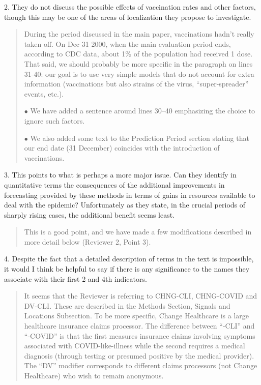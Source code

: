 \documentclass[11pt]{article}
\newenvironment{resp}{\begin{quote}\color{cobalt}}{\end{quote}}
\begin{document}
  2. They do not discuss the possible effects of vaccination rates and other
  factors, though this may be one of the areas of localization they propose to
  investigate.



\begin{resp}
  During the period discussed in the main paper, vaccinations hadn’t really
  taken off. On Dec 31 2000, when the main evaluation period ends,  according to
  CDC data, about 1\% of the population 
  had received 1 dose. That said, we should probably be more specific in the
  paragraph on lines 31-40: our goal is to use very simple models that do not
  account for extra information (vaccinations but also strains of the virus,
  ``super-spreader'' events, etc.).

  $\bullet$ We have added a sentence around lines 30--40 emphasizing the choice
  to ignore such factors.

  $\bullet$ We also added some text to the Prediction Period section stating
  that our end 
  date (31 December) coincides with the introduction of vaccinations.
\end{resp}


  3. This points to what is perhaps a more major issue. Can they identify in
  quantitative terms the consequences of the additional improvements in
  forecasting provided by these methods in terms of gains in resources available
  to deal with the epidemic? Unfortunately as they state, in the crucial periods
  of sharply rising cases, the additional benefit seems least.


\begin{resp}
  This is a good point, and we have made a few modifications described in more
  detail below (Reviewer 2, Point 3).
\end{resp}



  4. Despite the fact that a detailed description of terms in the text is
  impossible, it would I think be helpful to say if there is any significance to
  the names they associate with their first 2 and 4th indicators.


\begin{resp}
  It seems that the Reviewer is referring to CHNG-CLI, CHNG-COVID and DV-CLI. These are
  described in the Methods Section, Signals and Locations Subsection. To be more
  specific, Change 
  Healthcare is a large healthcare insurance claims processor. The difference
  between ``-CLI'' and ``-COVID'' is that the first measures insurance
  claims involving symptoms
  associated with COVID-like-illness  while the second requires a medical
  diagnosis (through 
  testing or presumed positive by the medical provider). The ``DV'' modifier
  corresponds to different claims processors (not Change Healthcare) who wish to
  remain anonymous.

\end{resp}
\end{document}
